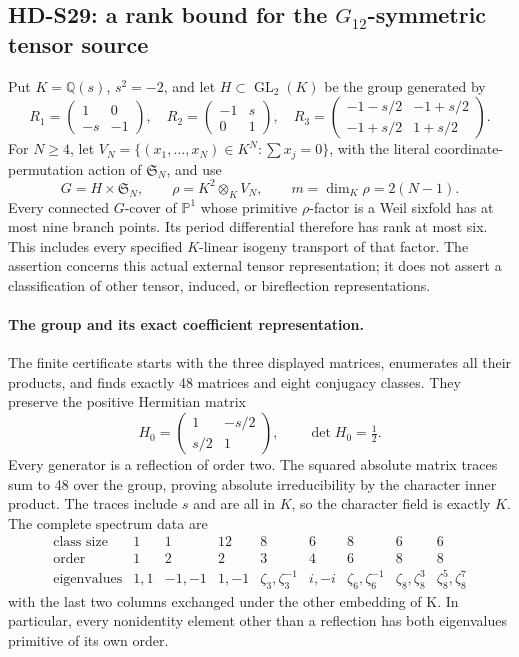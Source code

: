 \subsection{HD-S29: a rank bound for the \(G_{12}\)-symmetric tensor source}
\label{sec:g12-tensor-bound}

Put \(K=\mathbb Q(s)\), \(s^2=-2\), and let \(H\subset
\operatorname{GL}_2(K)\) be the group generated by
\[
 R_1=\begin{pmatrix}1&0\\-s&-1\end{pmatrix},\quad
 R_2=\begin{pmatrix}-1&s\\0&1\end{pmatrix},\quad
 R_3=\begin{pmatrix}-1-s/2&-1+s/2\\-1+s/2&1+s/2\end{pmatrix}.
\]
For \(N\ge4\), let \(V_N=\{(x_1,\ldots,x_N)\in K^N:
\sum x_j=0\}\), with the literal coordinate-permutation action of
\(\mathfrak S_N\), and use
\[
 G=H\times\mathfrak S_N,\qquad
 \rho=K^2\otimes_K V_N,\qquad m=\dim_K\rho=2(N-1).
\]
Every connected \(G\)-cover of \(\mathbb P^1\) whose primitive
\(\rho\)-factor is a Weil sixfold has at most nine branch points.
Its period differential therefore has rank at most six. This includes
every specified \(K\)-linear isogeny transport of that factor.
The assertion concerns this actual external tensor representation; it
does not assert a classification of other tensor, induced, or
bireflection representations.

\paragraph{The group and its exact coefficient representation.}
The finite certificate starts with the three displayed matrices,
enumerates all their products, and finds exactly 48 matrices and eight
conjugacy classes. They preserve the positive Hermitian matrix
\[
 H_0=\begin{pmatrix}1&-s/2\\s/2&1\end{pmatrix},
 \qquad \det H_0=\tfrac12.
\]
Every generator is a reflection of order two. The squared absolute
matrix traces sum to 48 over the group, proving absolute
irreducibility by the character inner product. The traces include
\(s\) and are all in \(K\), so the character field is exactly
\(K\). The complete spectrum data are
\[
\begin{array}{c|rrrrrrrr}
\text{class size}&1&1&12&8&6&8&6&6\\
\text{order}&1&2&2&3&4&6&8&8\\
\text{eigenvalues}&1,1&-1,-1&1,-1&
 \zeta_3,\zeta_3^{-1}&i,-i&\zeta_6,\zeta_6^{-1}&
 \zeta_8,\zeta_8^3&\zeta_8^5,\zeta_8^7
\end{array}
\]
with the last two columns exchanged under the other embedding of K.
In particular, every nonidentity element other than a reflection has
both eigenvalues primitive of its own order.

